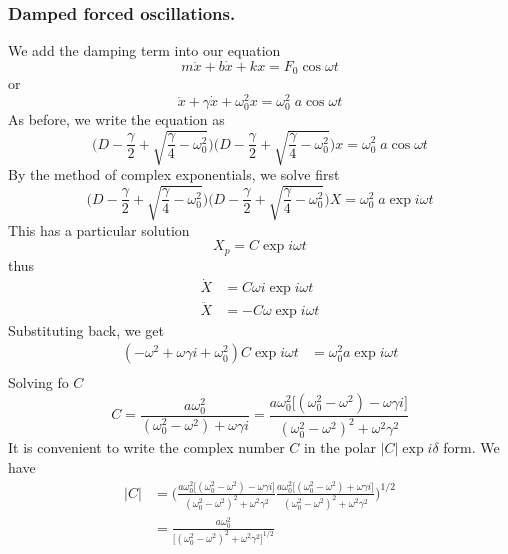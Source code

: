 \documentclass[../../../main.tex]{subfiles}
\begin{document}
\subsubsection{Damped forced oscillations.} We add the damping term into our equation
\begin{equation*}
    m\ddot{x}+b\dot{x}+kx=F_0 \cos \omega t
\end{equation*}
or
\begin{equation*}
    \ddot{x}+\gamma\dot{x}+\omega_0^2x=\omega_0^2\;a \cos \omega t
\end{equation*}
As before, we write the equation as 
\begin{equation*}
    \biggl(D-\frac{\gamma}{2}+\sqrt{\frac{\gamma}{4}-\omega_0^2}\biggr)\biggl(D-\frac{\gamma}{2}+\sqrt{\frac{\gamma}{4}-\omega_0^2}\biggr)x=\omega_0^2\;a \cos \omega t
\end{equation*}
By the method of complex exponentials, we solve first
\begin{equation*}
    \biggl(D-\frac{\gamma}{2}+\sqrt{\frac{\gamma}{4}-\omega_0^2}\biggr)\biggl(D-\frac{\gamma}{2}+\sqrt{\frac{\gamma}{4}-\omega_0^2}\biggr)X=\omega_0^2\;a \exp i\omega t
\end{equation*}
This has a particular solution
\begin{equation*}
    X_p=C\exp i\omega t
\end{equation*}
thus 
\begin{align*}
    \dot{X}&=C\omega i \exp i\omega t\\
    \ddot{X}&=-C\omega \exp i\omega t
\end{align*}
Substituting back, we get
\begin{align*}
    (-\omega^2+\omega \gamma i+\omega_0^2)C\exp{i\omega t}&=\omega_0^2a\exp{i\omega t}\\
\end{align*}
Solving fo $C$
\begin{equation*}
    C=\frac{a\omega_0^2}{(\omega_0^2-\omega^2)+\omega\gamma i}= \frac{a\omega_0^2 \big[(\omega_0^2-\omega^2)-\omega\gamma i\big]}{(\omega_0^2- \omega^2)^2 +\omega^2\gamma^2 }
\end{equation*}
It is convenient to write the complex number $C$ in the polar $|C|\exp i \delta$ form. We have
\begin{align*}
    |C|&=\Biggl( \frac{a\omega_0^2 \big[(\omega_0^2-\omega^2)-\omega\gamma i\big]}{(\omega_0^2- \omega^2)^2 +\omega^2\gamma^2 } \frac{a\omega_0^2 \big[(\omega_0^2-\omega^2)+\omega\gamma i\big]}{(\omega_0^2- \omega^2)^2 +\omega^2\gamma^2 }\Biggr)^{1/2}\\
    &= \frac{a\omega_0^2 }{\big[(\omega_0^2- \omega^2)^2 +\omega^2\gamma^2\big]^{1/2} }
\end{align*}
\end{document}
